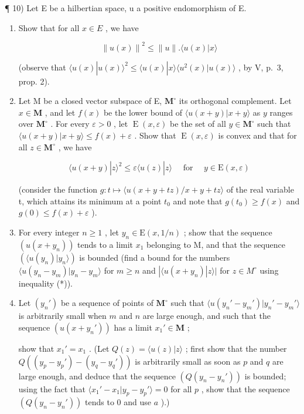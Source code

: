 ¶ 10) Let E be a hilbertian space, u a positive endomorphism of E.

\begin{enumerate}
\def\labelenumi{\alph{enumi})}
\tightlist
\item
  Show that for all \(x \in E\) , we have

\[
\left\| u (x) \right\| ^ {2} \leqslant \| u \|. \langle u (x) | x \rangle
\]

(observe that \(\langle u(x)|u(x)\rangle^2\leqslant \langle u(x)|x\rangle \langle u^2 (x)|u(x)\rangle\) , by V, p.~3, prop. 2).
\item
  Let M be a closed vector subspace of E, \(\mathbf{M}^{\circ}\) its orthogonal complement. Let \(x\in \mathbf{M}\) , and let \(f(x)\) be the lower bound of \(\langle u(x + y)|x + y\rangle\) as \(y\) ranges over \(\mathbf{M}^{\circ}\) . For every \(\varepsilon >0\) , let \(\operatorname {E}(x,\varepsilon)\) be the set of all \(y\in \mathbf{M}^{\circ}\) such that \(\langle u(x + y)|x + y\rangle \leqslant f(x) + \varepsilon\) . Show that \(\operatorname {E}(x,\varepsilon)\) is convex and that for all \(z\in \mathbf{M}^{\circ}\) , we have

\[
\langle u (x + y) | z \rangle^ {2} \leqslant \varepsilon \langle u (z) | z \rangle \quad \text { for } \quad y \in \mathrm{E} (x, \varepsilon)\tag{*}
\]

(consider the function \(g:t \mapsto \langle u(x + y + tz)/x + y + tz \rangle\) of the real variable t, which attains its minimum at a point \(t_{0}\) and note that \(g(t_{0}) \geqslant f(x)\) and \(g(0) \leqslant f(x) + \varepsilon\) ).
\item
  For every integer \(n \geqslant 1\) , let \(y_{n} \in \mathrm{E}(x, 1/n)\) ; show that the sequence \((u(x + y_{n}))\) tends to a limit \(x_{1}\) belonging to M, and that the sequence \((\langle u(y_{n})|y_{n}\rangle)\) is bounded (find a bound for the numbers \(\langle u(y_{n} - y_{m})|y_{n} - y_{m}\rangle\) for \(m \geqslant n\) and \(|\langle u(x + y_{n})|z\rangle|\) for \(z \in M^{\circ}\) using inequality (*)).

\item
  Let \((y_n')\) be a sequence of points of \(\mathbf{M}^\circ\) such that \(\langle u(y_n' - y_m')|y_n' - y_m'\rangle\) is arbitrarily small when \(m\) and \(n\) are large enough, and such that the sequence \((u(x + y_n'))\) has a limit \(x_1' \in \mathbf{M}\) ;

show that \(x_1' = x_1\) . (Let \(Q(z) = \langle u(z)|z \rangle\) ; first show that the number \(Q((y_p - y_p') - (y_q - y_q'))\) is arbitrarily small as soon as \(p\) and \(q\) are large enough, and deduce that the sequence \((Q(y_n - y_n'))\) is bounded; using the fact that \(\langle x_1' - x_1|y_p - y_p' \rangle = 0\) for all \(p\) , show that the sequence \((Q(y_n - y_n'))\) tends to 0 and use \(a\) ).)


\end{enumerate}
